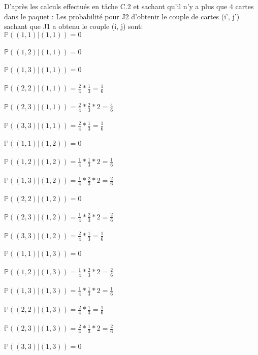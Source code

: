 \documentclass{article}
\begin{document}
D'après les calculs effectués en tâche C.2 et sachant qu'il n'y a plus que 4 cartes dans le paquet :
Les probabilité pour J2 d'obtenir le couple de cartes (i', j') sachant que J1 a obtenu le couple (i, j) sont:\\

$\mathbb{P}((1,1) | (1,1)) = 0$ \\ \\
$\mathbb{P}((1,2) | (1,1)) = 0$\\ \\
$\mathbb{P}((1,3) | (1,1)) = 0$\\ \\
$\mathbb{P}((2,2) | (1,1)) = \frac{2}{4} * \frac{1}{3}  = \frac{1}{6}$\\ \\
$\mathbb{P}((2,3) | (1,1)) = \frac{2}{4} * \frac{2}{3} * 2 = \frac{4}{6}$\\ \\
$\mathbb{P}((3,3) | (1,1)) = \frac{2}{4} * \frac{1}{3} = \frac{1}{6}$\\ \\

$\mathbb{P}((1,1) | (1,2)) = 0$ \\ \\
$\mathbb{P}((1,2) | (1,2)) = \frac{1}{4} * \frac{1}{3} *2 = \frac{1}{6}$\\ \\
$\mathbb{P}((1,3) | (1,2)) = \frac{1}{4} * \frac{2}{3} * 2 = \frac{2}{6}$\\ \\
$\mathbb{P}((2,2) | (1,2)) = 0$\\ \\
$\mathbb{P}((2,3) | (1,2)) = \frac{1}{4} * \frac{2}{3} *2 = \frac{2}{6}$\\ \\
$\mathbb{P}((3,3) | (1,2)) = \frac{2}{4} * \frac{1}{3} = \frac{1}{6}$\\ \\

$\mathbb{P}((1,1) | (1,3)) = 0$ \\ \\
$\mathbb{P}((1,2) | (1,3)) = \frac{1}{4} * \frac{2}{3} *2= \frac{2}{6}$\\ \\
$\mathbb{P}((1,3) | (1,3)) = \frac{1}{4} * \frac{1}{3} *2= \frac{1}{6}$\\ \\
$\mathbb{P}((2,2) | (1,3)) = \frac{2}{4} * \frac{1}{3} = \frac{1}{6}$\\ \\
$\mathbb{P}((2,3) | (1,3)) = \frac{2}{4} * \frac{1}{3} *2= \frac{2}{6}$\\ \\
$\mathbb{P}((3,3) | (1,3)) = 0$\\ \\
\end{document}
